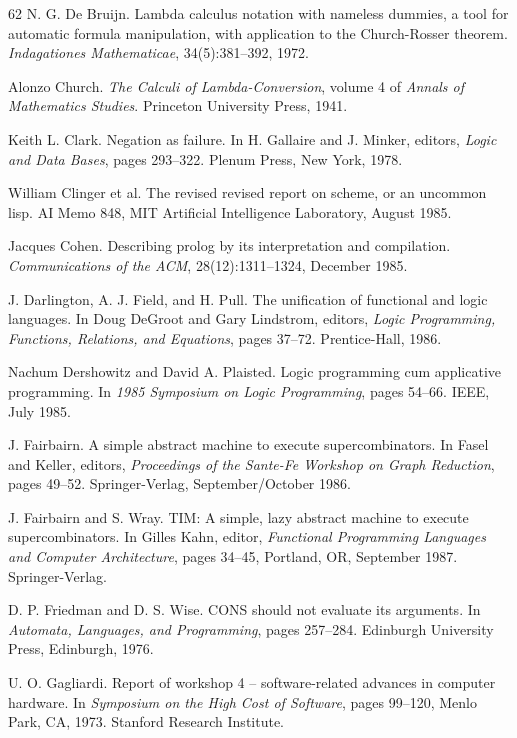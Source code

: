 \begin{thebibliography}{62}
N. G. De Bruijn.
Lambda calculus notation with nameless dummies, a tool for automatic formula
manipulation, with application to the Church-Rosser theorem.
\emph{Indagationes Mathematicae}, 34(5):381--392, 1972.

Alonzo Church.
\emph{The Calculi of Lambda-Conversion}, volume 4 of \emph{Annals of Mathematics
Studies}.
Princeton University Press, 1941.

Keith L. Clark.
Negation as failure.
In H. Gallaire and J. Minker, editors, \emph{Logic and Data Bases}, pages
293--322. Plenum Press, New York, 1978.

William Clinger et al.
The revised revised report on scheme, or an uncommon lisp.
AI Memo 848, MIT Artificial Intelligence Laboratory, August 1985.

Jacques Cohen.
Describing prolog by its interpretation and compilation.
\emph{Communications of the ACM}, 28(12):1311--1324, December 1985.

J. Darlington, A. J. Field, and H. Pull.
The unification of functional and logic languages.
In Doug DeGroot and Gary Lindstrom, editors, \emph{Logic Programming,
Functions, Relations, and Equations}, pages 37--72. Prentice-Hall, 1986.

Nachum Dershowitz and David A. Plaisted.
Logic programming cum applicative programming.
In \emph{1985 Symposium on Logic Programming}, pages 54--66. IEEE, July 1985.

J. Fairbairn.
A simple abstract machine to execute supercombinators.
In Fasel and Keller, editors, \emph{Proceedings of the Sante-Fe Workshop on
Graph Reduction}, pages 49--52. Springer-Verlag, September/October 1986.

J. Fairbairn and S. Wray.
TIM: A simple, lazy abstract machine to execute supercombinators.
In Gilles Kahn, editor, \emph{Functional Programming Languages and Computer
Architecture}, pages 34--45, Portland, OR, September 1987. Springer-Verlag.

D. P. Friedman and D. S. Wise.
CONS should not evaluate its arguments.
In \emph{Automata, Languages, and Programming}, pages 257--284. Edinburgh
University Press, Edinburgh, 1976.

U. O. Gagliardi.
Report of workshop 4 -- software-related advances in computer hardware.
In \emph{Symposium on the High Cost of Software}, pages 99--120, Menlo Park,
CA, 1973. Stanford Research Institute.


\end{thebibliography}
